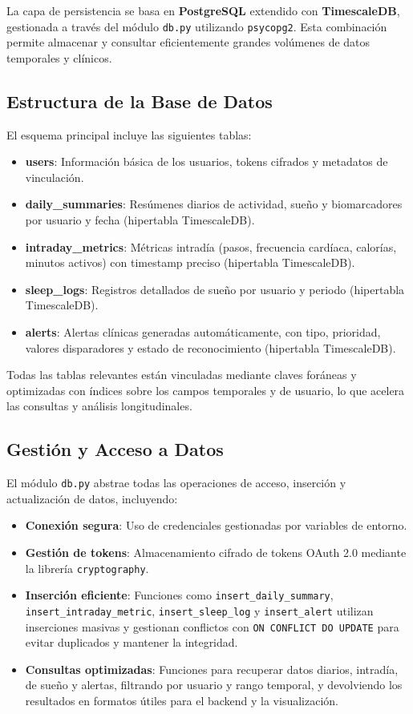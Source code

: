 La capa de persistencia se basa en \textbf{PostgreSQL} extendido con \textbf{TimescaleDB}, gestionada a través del módulo \texttt{db.py} utilizando \texttt{psycopg2}. Esta combinación permite almacenar y consultar eficientemente grandes volúmenes de datos temporales y clínicos.

\subsection{Estructura de la Base de Datos}
El esquema principal incluye las siguientes tablas:
\begin{itemize}
    \item \textbf{users}: Información básica de los usuarios, tokens cifrados y metadatos de vinculación.
    \item \textbf{daily\_summaries}: Resúmenes diarios de actividad, sueño y biomarcadores por usuario y fecha (hipertabla TimescaleDB).
    \item \textbf{intraday\_metrics}: Métricas intradía (pasos, frecuencia cardíaca, calorías, minutos activos) con timestamp preciso (hipertabla TimescaleDB).
    \item \textbf{sleep\_logs}: Registros detallados de sueño por usuario y periodo (hipertabla TimescaleDB).
    \item \textbf{alerts}: Alertas clínicas generadas automáticamente, con tipo, prioridad, valores disparadores y estado de reconocimiento (hipertabla TimescaleDB).
\end{itemize}
Todas las tablas relevantes están vinculadas mediante claves foráneas y optimizadas con índices sobre los campos temporales y de usuario, lo que acelera las consultas y análisis longitudinales.

\subsection{Gestión y Acceso a Datos}
El módulo \texttt{db.py} abstrae todas las operaciones de acceso, inserción y actualización de datos, incluyendo:
\begin{itemize}
    \item \textbf{Conexión segura}: Uso de credenciales gestionadas por variables de entorno.
    \item \textbf{Gestión de tokens}: Almacenamiento cifrado de tokens OAuth 2.0 mediante la librería \texttt{cryptography}.
    \item \textbf{Inserción eficiente}: Funciones como \texttt{insert\_daily\_summary}, \texttt{insert\_intraday\_metric}, \texttt{insert\_sleep\_log} y \texttt{insert\_alert} utilizan inserciones masivas y gestionan conflictos con \texttt{ON CONFLICT DO UPDATE} para evitar duplicados y mantener la integridad.
    \item \textbf{Consultas optimizadas}: Funciones para recuperar datos diarios, intradía, de sueño y alertas, filtrando por usuario y rango temporal, y devolviendo los resultados en formatos útiles para el backend y la visualización.
\end{itemize}

